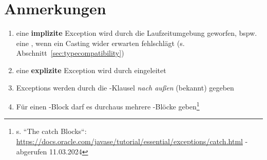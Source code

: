 \section{Anmerkungen}

\begin{enumerate}
    \item eine \textbf{implizite} Exception wird durch die Laufzeitumgebung geworfen, bspw. eine , wenn ein Casting wider erwarten fehlschlägt (s. Abschnitt~\ref{sec:typecompatibility})
    \item eine \textbf{explizite} Exception wird durch  eingeleitet
    \item Exceptions werden durch die -Klausel \textit{nach außen} (bekannt) gegeben
    \item Für einen -Block darf es durchaus mehrere -Blöcke geben\footnote{
    s. ``The catch Blocks``: \url{https://docs.oracle.com/javase/tutorial/essential/exceptions/catch.html} - abgerufen 11.03.2024
    }
\end{enumerate}